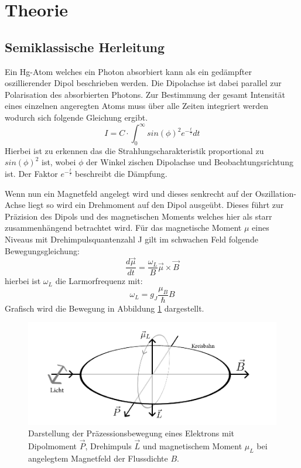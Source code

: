 \section{Theorie}
\subsection{Semiklassische Herleitung}
Ein Hg-Atom welches ein Photon absorbiert kann als ein gedämpfter oszillierender Dipol beschrieben werden. Die Dipolachse ist dabei parallel zur Polarisation des absorbierten Photons. Zur Bestimmung der gesamt Intensität eines einzelnen angeregten Atoms muss über alle Zeiten integriert werden wodurch sich folgende Gleichung ergibt.
\begin{equation}
	I=C\cdot \int_{0}^{\infty}sin(\phi)^2e^{-\frac{t}{\tau}}dt
\end{equation}
Hierbei ist zu erkennen das die Strahlungscharakteristik proportional zu $sin(\phi)^2$ ist, wobei $\phi$ der Winkel zischen Dipolachse und Beobachtungsrichtung ist. Der Faktor $e^{-\frac{t}{\tau}}$ beschreibt die Dämpfung.\par
Wenn nun ein Magnetfeld angelegt wird und dieses senkrecht auf der Oszillation-Achse liegt so wird ein Drehmoment auf den Dipol ausgeübt. Dieses führt zur Präzision des Dipols und des magnetischen Moments welches hier als starr zusammenhängend betrachtet wird. Für das magnetische Moment $\mu$ eines Niveaus mit Drehimpulsquantenzahl J gilt
im schwachen Feld folgende Bewegungsgleichung:
\begin{equation}
\frac{d\vec{\mu}}{dt}=\frac{\omega_L}{B}\vec{\mu}\times\vec{B}
\label{Präzesion}
\end{equation}
hierbei ist $\omega_L$ die Larmorfrequenz mit:
\begin{equation}
	\omega_L=g_J\frac{\mu_B}{\hbar}B
\end{equation}
Grafisch wird die Bewegung in Abbildung \ref{Präzesionsbild} dargestellt.
\begin{figure}[ht]
	\includegraphics[scale=0.8]{Bild/TestP}
	\centering
	\caption[Semiklassische Darstellung des Hanle Effekts]{Darstellung der Präzessionsbewegung eines Elektrons mit Dipolmoment $\vec{P}$, Drehimpuls $\vec{L}$ und magnetischem Moment $\mu_L$ bei angelegtem Magnetfeld der Flussdichte $B$.\cite{anleitung}}
	\label{Präzesionsbild}
\end{figure}\\
